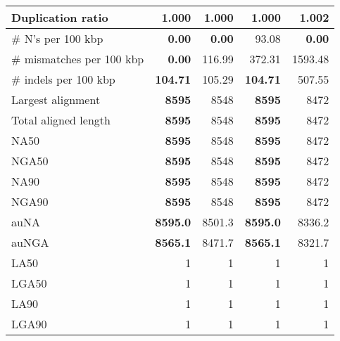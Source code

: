\documentclass[12pt,a4paper]{article}
\begin{document}
\begin{table}[ht]
\begin{center}
\begin{tabular}{|l*{4}{|r}|}
Duplication ratio & {\bf 1.000} & {\bf 1.000} & {\bf 1.000} & 1.002 \\ \hline
\# N's per 100 kbp & {\bf 0.00} & {\bf 0.00} & 93.08 & {\bf 0.00} \\ \hline
\# mismatches per 100 kbp & {\bf 0.00} & 116.99 & 372.31 & 1593.48 \\ \hline
\# indels per 100 kbp & {\bf 104.71} & 105.29 & {\bf 104.71} & 507.55 \\ \hline
Largest alignment & {\bf 8595} & 8548 & {\bf 8595} & 8472 \\ \hline
Total aligned length & {\bf 8595} & 8548 & {\bf 8595} & 8472 \\ \hline
NA50 & {\bf 8595} & 8548 & {\bf 8595} & 8472 \\ \hline
NGA50 & {\bf 8595} & 8548 & {\bf 8595} & 8472 \\ \hline
NA90 & {\bf 8595} & 8548 & {\bf 8595} & 8472 \\ \hline
NGA90 & {\bf 8595} & 8548 & {\bf 8595} & 8472 \\ \hline
auNA & {\bf 8595.0} & 8501.3 & {\bf 8595.0} & 8336.2 \\ \hline
auNGA & {\bf 8565.1} & 8471.7 & {\bf 8565.1} & 8321.7 \\ \hline
LA50 & 1 & 1 & 1 & 1 \\ \hline
LGA50 & 1 & 1 & 1 & 1 \\ \hline
LA90 & 1 & 1 & 1 & 1 \\ \hline
LGA90 & 1 & 1 & 1 & 1 \\ \hline
\end{tabular}
\end{center}
\end{table}
\end{document}
